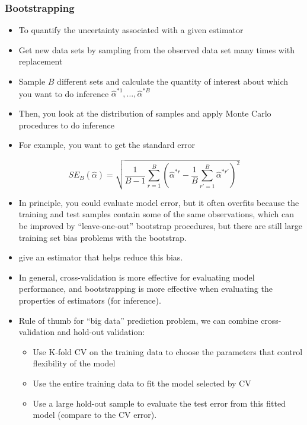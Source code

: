 \documentclass[
]{book}
\begin{document}
\hypertarget{bootstrapping}{%
\subsubsection{Bootstrapping}\label{bootstrapping}}

\begin{itemize}
\item
  To quantify the uncertainty associated with a given estimator
\item
  Get new data sets by sampling from the observed data set many times with replacement
\item
  Sample \(B\) different sets and calculate the quantity of interest about which you want to do inference \(\hat{\alpha}^{*1},\dots, \hat{\alpha}^{*B}\)
\item
  Then, you look at the distribution of samples and apply Monte Carlo procedures to do inference
\item
  For example, you want to get the standard error
\end{itemize}

\[
SE_B (\hat{\alpha}) = \sqrt{\frac{1}{B-1} \sum_{r=1}^B (\hat{\alpha}^{*r} - \frac{1}{B} \sum_{r'=1}^B \hat{\alpha}^{*r'})^2}
\]

\begin{itemize}
\item
  In principle, you could evaluate model error, but it often overfits because the training and test samples contain some of the same observations, which can be improved by ``leave-one-out'' bootstrap procedures, but there are still large training set bias problems with the bootstrap.
\item
  \citep{hastie2001a} give an estimator that helps reduce this bias.
\item
  In general, cross-validation is more effective for evaluating model performance, and bootstrapping is more effective when evaluating the properties of estimators (for inference).
\item
  Rule of thumb for ``big data'' prediction problem, we can combine cross-validation and hold-out validation:

  \begin{itemize}
  \item
    Use K-fold CV on the training data to choose the parameters that control flexibility of the model
  \item
    Use the entire training data to fit the model selected by CV
  \item
    Use a large hold-out sample to evaluate the test error from this fitted model (compare to the CV error).
  \end{itemize}
\end{itemize}
\end{document}
